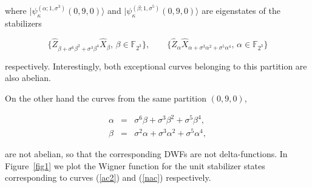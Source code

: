 \documentclass[quantumrep,article,submit,pdftex,moreauthors]{Definitions/mdpi}
\begin{document}
where $|\psi_{\kappa}^{(\alpha ; 1,\sigma^{3})}(0,9,0)\rangle$ and
$|\psi_{\kappa }^{(\beta ; 1,\sigma^{5})}(0,9,0)\rangle$ are eigenstates of the
stabilizers 

\begin{equation*}
	\{\hat{Z}_{\beta +\sigma ^{6}\beta ^{2}+\sigma^{3}\beta^{4}}
\hat{X}_{\beta }, \, \beta \in \mathbb{F}_{2^{3}}\},
\qquad \{\hat{Z}_{\alpha } \hat{X}_{\alpha + \sigma^{3}\alpha^{2} +
	\sigma^{5}\alpha^{4}}, \, \alpha \in
\mathbb{F}_{2^{3}}\}
\end{equation*}

respectively. Interestingly, both exceptional curves
belonging to this partition are also abelian.

On the other hand the curves from the same partition $(0,9,0)$,

\begin{eqnarray}
  \alpha &=&\sigma^{6}\beta +\sigma ^{3}\beta ^{2}+\sigma ^{5}\beta ^{4},
  \label{nac1} \\
  \beta &=&\sigma^{2}\alpha +\sigma ^{3}\alpha ^{2}+\sigma ^{5}\alpha ^{4},
  \label{nac}
\end{eqnarray}

are not abelian, so that the corresponding DWFs are not delta-functions. In
Figure~\ref{fig1} we plot the Wigner function for the unit stabilizer states
corresponding to curves (\ref{ac2}) and (\ref{nac}) respectively.
\end{document}
